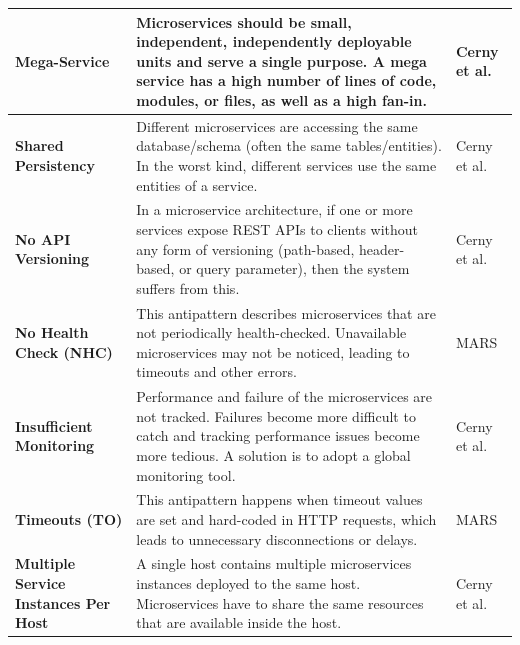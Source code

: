 \begin{table}[H]
\begin{tabular}{| p{3cm} | p{8.5cm} | p{3cm} |}
        \textbf{Mega-Service} & Microservices should be small, independent, independently deployable units and serve a single purpose. A mega service has a high number of lines of code, modules, or files, as well as a high fan-in. & Cerny et al. \cite{CernyCatalogo} \\ \hline

        \textbf{Shared \newline Persistency} & Different microservices are accessing the same database/schema (often the same tables/entities). In the worst kind, different services use the same entities of a service. & Cerny et al. \cite{CernyCatalogo} \\ \hline

        \textbf{No API \newline Versioning} & In a microservice architecture, if one or more services expose REST APIs to clients without any form of versioning (path-based, header-based, or query parameter), then the system suffers from this. & Cerny et al. \cite{CernyCatalogo} \\ \hline

        \textbf{No Health Check \newline (NHC)} & This antipattern describes microservices that are not periodically health-checked. Unavailable microservices may not be noticed, leading to timeouts and other errors. & MARS \cite{MARS} \\ \hline

        \textbf{Insufficient \newline Monitoring} & Performance and failure of the microservices are not tracked. Failures become more difficult to catch and tracking performance issues become more tedious. A solution is to adopt a global monitoring tool. & Cerny et al. \cite{CernyCatalogo} \\ \hline

        \textbf{Timeouts \newline (TO)} & This antipattern happens when timeout values are set and hard-coded in HTTP requests, which leads to unnecessary disconnections or delays. & MARS \cite{MARS} \\ \hline

        \textbf{Multiple Service \newline Instances Per Host} & A single host contains multiple microservices instances deployed to the same host. Microservices have to share the same resources that are available inside the host. & Cerny et al. \cite{CernyCatalogo} \\ \hline


\end{tabular}
\end{table}
